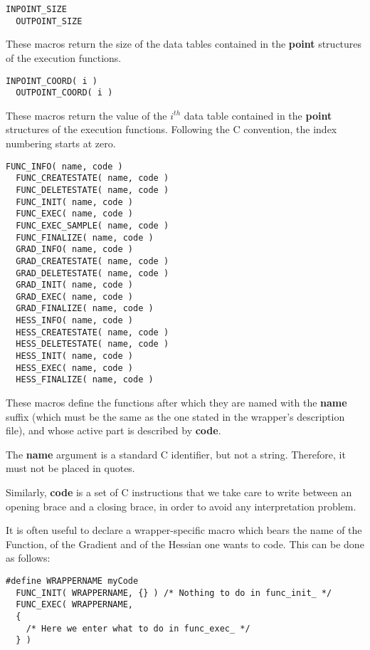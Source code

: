 \lstset{language=C++, basicstyle=\normalsize}
\begin{lstlisting}[frame=TRBL]
  INPOINT_SIZE
  OUTPOINT_SIZE
\end{lstlisting}

These macros return the size of the data tables contained in the {\bf point} structures of the execution functions.

\lstset{language=C++, basicstyle=\normalsize}
\begin{lstlisting}[frame=TRBL]
  INPOINT_COORD( i )
  OUTPOINT_COORD( i )
\end{lstlisting}

These macros return the value of the $i^{th}$ data table contained in the {\bf point} structures of the execution functions. Following the C convention, the index numbering starts at zero.

\lstset{language=C++, basicstyle=\normalsize}
\begin{lstlisting}[frame=TRBL]
  FUNC_INFO( name, code )
  FUNC_CREATESTATE( name, code )
  FUNC_DELETESTATE( name, code )
  FUNC_INIT( name, code )
  FUNC_EXEC( name, code )
  FUNC_EXEC_SAMPLE( name, code )
  FUNC_FINALIZE( name, code )
  GRAD_INFO( name, code )
  GRAD_CREATESTATE( name, code )
  GRAD_DELETESTATE( name, code )
  GRAD_INIT( name, code )
  GRAD_EXEC( name, code )
  GRAD_FINALIZE( name, code )
  HESS_INFO( name, code )
  HESS_CREATESTATE( name, code )
  HESS_DELETESTATE( name, code )
  HESS_INIT( name, code )
  HESS_EXEC( name, code )
  HESS_FINALIZE( name, code )
\end{lstlisting}

These macros define the functions after which they are named with the {\bf name} suffix (which must be the same as the one stated in the wrapper's description file), and whose active part is described by {\bf code}.

The {\bf name} argument is a standard C identifier, but not a string. Therefore, it must not be placed in quotes.

Similarly, {\bf code} is a set of C instructions that we take care to write between an opening brace and a closing brace, in order to avoid any interpretation problem.

It is often useful to declare a wrapper-specific macro which bears the name of the Function, of the Gradient and of the Hessian one wants to code. This can be done as follows:

\lstset{language=C++, basicstyle=\normalsize}
\begin{lstlisting}[frame=TRBL]
  #define WRAPPERNAME myCode
  FUNC_INIT( WRAPPERNAME, {} ) /* Nothing to do in func_init_ */
  FUNC_EXEC( WRAPPERNAME,
  {
    /* Here we enter what to do in func_exec_ */
  } )
\end{lstlisting}

